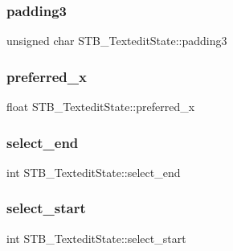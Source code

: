 \subsubsection{\texorpdfstring{padding3}{padding3}}
{\footnotesize\ttfamily unsigned char S\+T\+B\+\_\+\+Textedit\+State\+::padding3}

\hypertarget{struct_s_t_b___textedit_state_a527319df94e0fe262548fb48bebf3dea}{}\label{struct_s_t_b___textedit_state_a527319df94e0fe262548fb48bebf3dea} 
\subsubsection{\texorpdfstring{preferred\+\_\+x}{preferred\_x}}
{\footnotesize\ttfamily float S\+T\+B\+\_\+\+Textedit\+State\+::preferred\+\_\+x}

\hypertarget{struct_s_t_b___textedit_state_abf8b1b1064770e4579c5bb8c4a41d8f0}{}\label{struct_s_t_b___textedit_state_abf8b1b1064770e4579c5bb8c4a41d8f0} 
\subsubsection{\texorpdfstring{select\+\_\+end}{select\_end}}
{\footnotesize\ttfamily int S\+T\+B\+\_\+\+Textedit\+State\+::select\+\_\+end}

\hypertarget{struct_s_t_b___textedit_state_a74d595403e0b6f99cd0163ee87f4344d}{}\label{struct_s_t_b___textedit_state_a74d595403e0b6f99cd0163ee87f4344d} 
\subsubsection{\texorpdfstring{select\+\_\+start}{select\_start}}
{\footnotesize\ttfamily int S\+T\+B\+\_\+\+Textedit\+State\+::select\+\_\+start}

\hypertarget{struct_s_t_b___textedit_state_a63299aca2cb4e009dfa41cda5e651316}{}\label{struct_s_t_b___textedit_state_a63299aca2cb4e009dfa41cda5e651316} 

